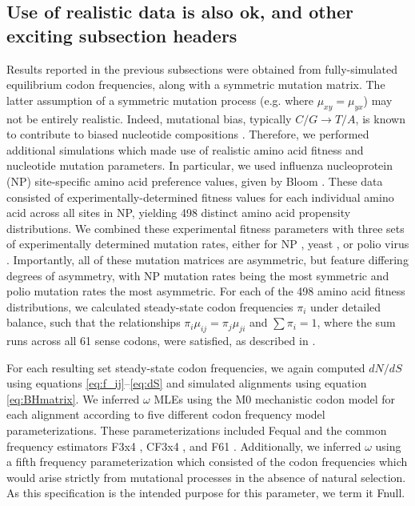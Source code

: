 \documentclass[11pt]{article}
\begin{document}
\subsection*{Use of realistic data is also ok, and other exciting subsection headers}

Results reported in the previous subsections were obtained from fully-simulated equilibrium codon frequencies, along with a symmetric mutation matrix. The latter assumption of a symmetric mutation process (e.g. where $\mu_{xy} = \mu_{yx}$) may not be entirely realistic. Indeed, mutational bias, typically $C/G \rightarrow T/A$, is known to contribute to biased nucleotide compositions \cite{Hernandez2007,HershbergPetrov2010,Zhu2014,Acevedo2014}. Therefore, we performed additional simulations which made use of realistic amino acid fitness and nucleotide mutation parameters.  In particular, we used influenza nucleoprotein (NP) site-specific amino acid preference values, given by Bloom \cite{Bloom2014a}. These data consisted of experimentally-determined fitness values for each individual amino acid across all sites in NP, yielding 498 distinct amino acid propensity distributions. We combined these experimental fitness parameters with three sets of experimentally determined mutation rates, either for NP \cite{Bloom2014a}, yeast \cite{Zhu2014}, or polio virus \cite{Acevedo2014}. Importantly, all of these mutation matrices are asymmetric, but feature differing degrees of asymmetry, with NP mutation rates being the most symmetric and polio mutation rates the most asymmetric. For each of the 498 amino acid fitness distributions, we calculated steady-state codon frequencies $\pi_i$ under detailed balance, such that the relationships $\pi_i\mu_{ij} = \pi_j\mu_{ji}$ and $\sum\pi_i = 1$, where the sum runs across all 61 sense codons, were satisfied, as described in \cite{Bloom2014a,Bloom2014b}. 

For each resulting set steady-state codon frequencies, we again computed $dN/dS$ using equations \eqref{eq:f_ij}--\eqref{eq:dS} and simulated alignments  using equation \eqref{eq:BHmatrix}. We inferred $\omega$ MLEs using the M0 mechanistic codon model for each alignment according to five different codon frequency model parameterizations. These parameterizations included Fequal \cite{Yang2006} and the common frequency estimators F3x4 \cite{MuseGaut1994}, CF3x4 \cite{Pond2010}, and F61 \cite{GoldmanYang1994}. Additionally, we inferred $\omega$ using a fifth frequency parameterization which consisted of the codon frequencies which would arise strictly from mutational processes in the absence of natural selection. As this specification is the intended purpose for this parameter, we term it Fnull.
\end{document}
